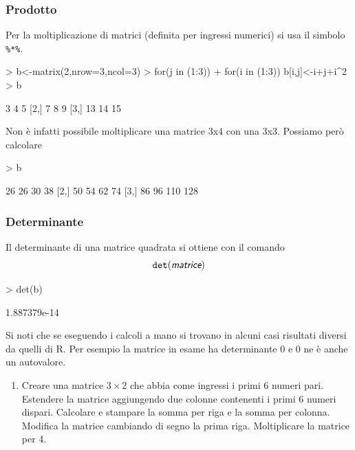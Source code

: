 \documentclass[onecolumn,12pt]{book}
\newcommand{\varia}[1]{\textsl{\textsf{#1}}}
\begin{document}
\subsubsection{Prodotto}
Per la  moltiplicazione di matrici (definita per ingressi numerici) si usa il simbolo \texttt{\%*\%}.
\begin{Schunk}
\begin{Sinput}
> b<-matrix(2,nrow=3,ncol=3)
> for(j in (1:3))
+ for(i in (1:3)) b[i,j]<-i+j+i^2
> b
\end{Sinput}
\begin{Soutput}
     [,1] [,2] [,3]
[1,]    3    4    5
[2,]    7    8    9
[3,]   13   14   15
\end{Soutput}
\end{Schunk}
Non \`e infatti possibile moltiplicare una matrice 3x4 con una 3x3. Possiamo per\`o calcolare
\begin{Schunk}
\begin{Sinput}
> b%
\end{Sinput}
\begin{Soutput}
     [,1] [,2] [,3] [,4]
[1,]   26   26   30   38
[2,]   50   54   62   74
[3,]   86   96  110  128
\end{Soutput}
\end{Schunk}
\subsubsection{Determinante} Il determinante di una matrice quadrata si ottiene con il comando
\begin{equation}\texttt{det} (\varia{matrice})\end{equation}
\begin{Schunk}
\begin{Sinput}
> det(b)
\end{Sinput}
\begin{Soutput}
[1] 1.887379e-14
\end{Soutput}
\end{Schunk}

Si noti che se eseguendo i calcoli a mano si trovano in alcuni casi risultati diversi da quelli di {\textsf R}. Per esempio la matrice in esame ha determinante 0 e 0 ne \`e anche un autovalore.
\begin{shaded}
 \begin{enumerate}
 \item{}Creare una matrice $3\times 2$ che abbia come ingressi i primi 6 numeri pari. Estendere la matrice aggiungendo due colonne contenenti i primi 6 numeri dispari. Calcolare e stampare la somma per riga e la somma per colonna. Modifica la matrice cambiando di segno la prima riga. Moltiplicare la matrice  per 4.
 \end{enumerate}
 \end{shaded}
\end{document}
